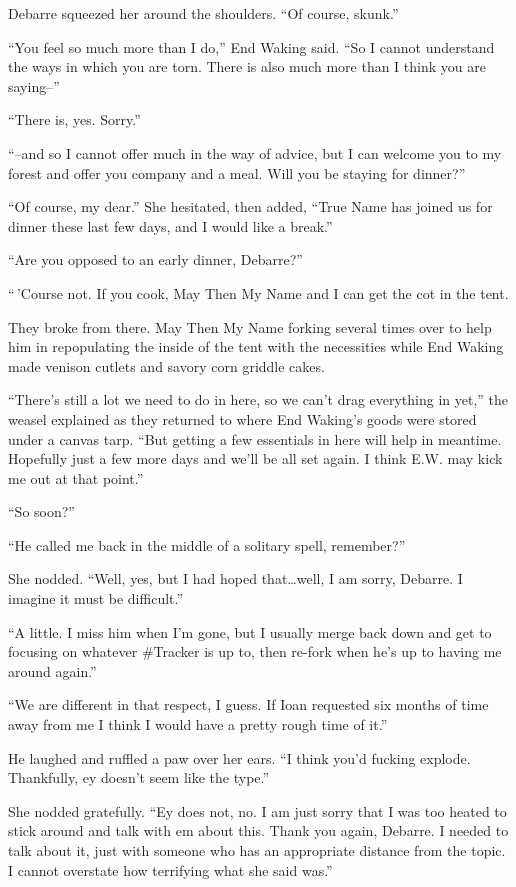Debarre squeezed her around the shoulders. ``Of course, skunk.''

``You feel so much more than I do,'' End Waking said. ``So I cannot understand the ways in which you are torn. There is also much more than I think you are saying--''

``There is, yes. Sorry.''

``--and so I cannot offer much in the way of advice, but I can welcome you to my forest and offer you company and a meal. Will you be staying for dinner?''

``Of course, my dear.'' She hesitated, then added, ``True Name has joined us for dinner these last few days, and I would like a break.''

``Are you opposed to an early dinner, Debarre?''

``\,'Course not. If you cook, May Then My Name and I can get the cot in the tent.

They broke from there. May Then My Name forking several times over to help him in repopulating the inside of the tent with the necessities while End Waking made venison cutlets and savory corn griddle cakes.

``There's still a lot we need to do in here, so we can't drag everything in yet,'' the weasel explained as they returned to where End Waking's goods were stored under a canvas tarp. ``But getting a few essentials in here will help in meantime. Hopefully just a few more days and we'll be all set again. I think E.W. may kick me out at that point.''

``So soon?''

``He called me back in the middle of a solitary spell, remember?''

She nodded. ``Well, yes, but I had hoped that\ldots well, I am sorry, Debarre. I imagine it must be difficult.''

``A little. I miss him when I'm gone, but I usually merge back down and get to focusing on whatever \#Tracker is up to, then re-fork when he's up to having me around again.''

``We are different in that respect, I guess. If Ioan requested six months of time away from me I think I would have a pretty rough time of it.''

He laughed and ruffled a paw over her ears. ``I think you'd fucking explode. Thankfully, ey doesn't seem like the type.''

She nodded gratefully. ``Ey does not, no. I am just sorry that I was too heated to stick around and talk with em about this. Thank you again, Debarre. I needed to talk about it, just with someone who has an appropriate distance from the topic. I cannot overstate how terrifying what she said was.''


